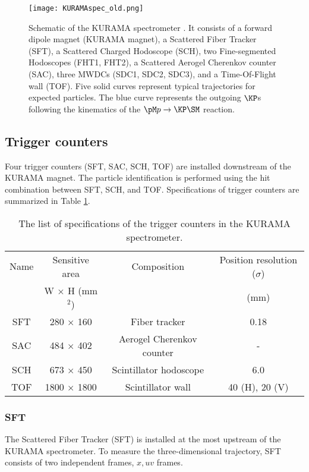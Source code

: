 \begin{figure}[!h]
 \begin{center}
   \texttt{[image: KURAMAspec\_old.png]}
   \caption{Schematic of the KURAMA spectrometer \cite{Nana-D}. It consists of a forward dipole magnet (KURAMA magnet), a Scattered Fiber Tracker (SFT), a Scattered Charged Hodoscope (SCH), two Fine-segmented Hodoscopes (FHT1, FHT2), a Scattered Aerogel Cherenkov counter (SAC), three MWDCs (SDC1, SDC2, SDC3), and a Time-Of-Flight wall (TOF). Five solid curves represent typical trajectories for expected particles. The blue curve represents the outgoing $\KP$s following the kinematics of the $\pM p\to\KP\SM$ reaction.}
   \label{fig-KURAMAspec}
 \end{center}
\end{figure}

%
\subsection{Trigger counters}
Four trigger counters (SFT, SAC, SCH, TOF) are installed downstream of the KURAMA magnet. The particle identification is performed using the hit combination between SFT, SCH, and TOF. Specifications of trigger counters are summarized in Table \ref{tab-KURAMAspec-trig}.

\begin{table}[h]
  \begin{center}
    \caption{The list of specifications of the trigger counters in the KURAMA spectrometer.}
    \begin{tabular}{cccc} \hline \hline
      Name & Sensitive area & Composition & Position resolution ($\sigma$) \\
       & W $\times$ H (mm$^2$) & & (mm) \\ \hline
      SFT& 280 $\times$ 160 & Fiber tracker & 0.18  \\
      SAC& 484 $\times$ 402 & Aerogel Cherenkov counter & -  \\
      SCH & 673 $\times$ 450 & Scintillator hodoscope & 6.0  \\ 
      TOF & 1800 $\times$ 1800 & Scintillator wall & 40 (H), 20 (V)  \\ 
\hline\hline
   \end{tabular}
   \label{tab-KURAMAspec-trig}
   \end{center}
\end{table}

%
\subsubsection{SFT}
The Scattered Fiber Tracker (SFT) is installed at the most upstream of the KURAMA spectrometer. To measure the three-dimensional trajectory, SFT consists of two independent frames, $x, uv$ frames.

